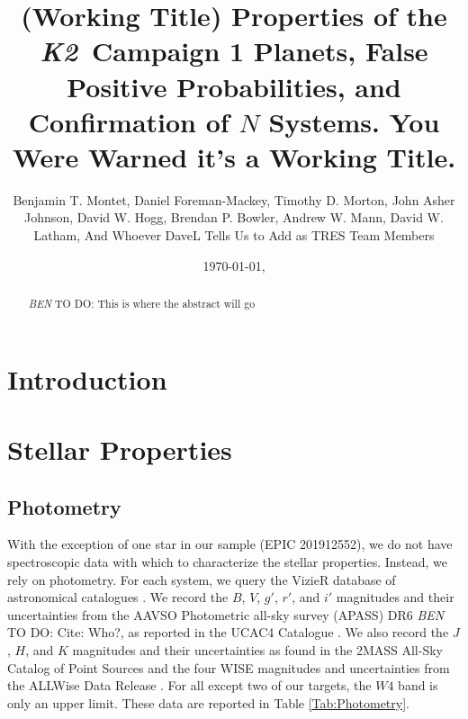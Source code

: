 \documentclass{emulateapj}
\newcommand{\project}[1]{\textsl{#1}}
\newcommand{\KT}{\project{K2}}
\newcommand{\todo}[3]{{\color{#2} \emph{#1} TO DO: #3}}
\newcommand{\btmtodo}[1]{\todo{BEN}{red}{#1}}
\begin{document}
\title{(Working Title) Properties of the \KT\ Campaign 1 Planets, 
False Positive Probabilities, and Confirmation of $N$ Systems. You 
Were Warned it's a Working Title.}

\author{
Benjamin T. Montet, 
Daniel Foreman-Mackey,
Timothy D. Morton,
John Asher Johnson,
David W. Hogg,
Brendan P. Bowler,
Andrew W. Mann,
David W. Latham,
And Whoever DaveL Tells Us to Add as TRES Team Members
}




\date{\today, \currenttime}

\begin{abstract}
\btmtodo{This is where the abstract will go}
\end{abstract}

\keywords{\btmtodo{Keywords}}

\maketitle

\section{Introduction}


\section{Stellar Properties}
\subsection{Photometry}

With the exception of one star in our sample (EPIC 201912552), we do not have
spectroscopic data with which to characterize the stellar properties. 
Instead, we rely on photometry.
For each system, we query the VizieR database of astronomical catalogues
\citep{Ochseinbein00}. 
We record the $B$, $V$, $g'$, $r'$, and $i'$ magnitudes and their
uncertainties from the AAVSO Photometric all-sky survey (APASS) DR6 
\btmtodo{Cite: Who?}, as reported in the UCAC4 Catalogue \citep{Zacharias12}.
We also record the $J$, $H$, and $K$ magnitudes and their uncertainties 
as found in the 2MASS All-Sky Catalog of Point Sources \citep{Cutri03}
and the four WISE magnitudes and uncertainties from the ALLWise Data
Release \citep{Cutri13}.
For all except two of our targets, the $W4$ band is only an upper limit.
These data are reported in Table \ref{Tab:Photometry}.
\end{document}
